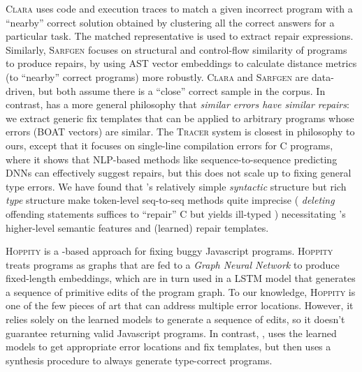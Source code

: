 %
\textsc{Clara} \citep{Gulwani_2018} uses code and execution traces to match a
given incorrect program with a ``nearby'' correct solution obtained by
clustering all the correct answers for a particular task. The matched
representative is used to extract repair expressions.
%
Similarly, \textsc{Sarfgen} \citep{Wang_2018} focuses on structural and
control-flow similarity of programs to produce repairs, by using AST vector
embeddings to calculate distance metrics (to ``nearby'' correct
programs) more robustly.
%
\textsc{Clara} and \textsc{Sarfgen} are data-driven, but both assume
there is a ``close'' correct sample in the corpus.
%
In contrast, \toolname has a more general philosophy that \emph{similar errors
have similar repairs}: we extract generic fix templates that can be applied to
arbitrary programs whose errors (BOAT vectors) are similar.
%
The \textsc{Tracer} system \citep{TRACER2018} is closest in philosophy to ours,
except that it focuses on single-line compilation errors for C programs, where
it shows that NLP-based methods like sequence-to-sequence predicting DNNs can
effectively suggest repairs, %
but this does not scale up to fixing general type errors.
%
We have found that \ocaml's relatively simple
\emph{syntactic} structure but rich \emph{type}
structure make token-level seq-to-seq methods quite imprecise (\eg
\emph{deleting} offending statements suffices to ``repair'' C but yields
ill-typed \ocaml) necessitating \toolname's higher-level semantic features and
(learned) repair templates.

\textsc{Hoppity} \citep{Dinella_2020} is a \dnn-based approach for fixing buggy
Javascript programs. \textsc{Hoppity} treats programs as graphs that are
fed to a \textit{Graph Neural Network} to produce fixed-length embeddings,
which are in turn used in a LSTM model that generates a sequence of primitive
edits of the program graph. To our knowledge, \textsc{Hoppity} is one of the few
pieces of art that can address multiple error locations. However, it relies
solely on the learned models to generate a sequence of edits, so it
doesn't guarantee returning valid Javascript programs.
In contrast, \toolname, uses the learned models to get appropriate error locations
and fix templates, but then uses a synthesis procedure to always generate
type-correct programs.

